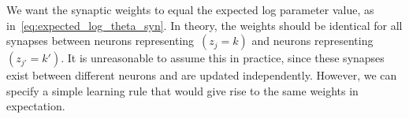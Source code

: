 

We want the synaptic weights to equal the expected log parameter
value, as in~\eqref{eq:expected_log_theta_syn}.  In theory, the weights
should be identical for all synapses between neurons
representing~${(z_j=k)}$ and neurons representing~${(z_{j'}=k')}$.  It is
unreasonable to assume this in practice, since these synapses exist between
different neurons and are updated independently. However, we can
specify a simple learning rule that would give rise to the same
weights in expectation.

